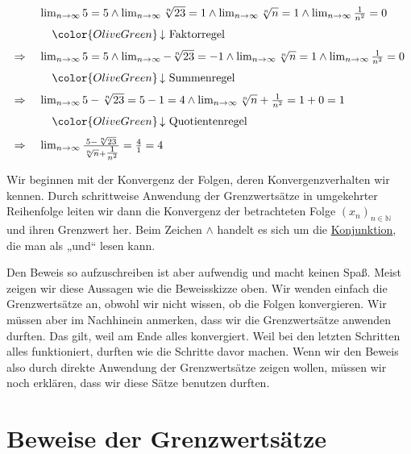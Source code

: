 \documentclass[fontsize=9pt,
               parskip=half-,
               DIV=14,
               listof=chapterentry,
               tocflat]{scrbook}
\begin{document}
\begin{align*}
{\begin{array}{ll}&\lim _{n\rightarrow \infty }5=5\land \lim _{n\rightarrow \infty }{\sqrt[{n}]{23}}=1\land \lim _{n\rightarrow \infty }{\sqrt[{n}]{n}}=1\land \lim _{n\rightarrow \infty }{\tfrac {1}{n^{2}}}=0\\[0.7em]&\quad {\color {OliveGreen}\left\downarrow \ {\text{Faktorregel}}\right.}\\[0.7em]\Rightarrow \ &\lim _{n\rightarrow \infty }5=5\land \lim _{n\rightarrow \infty }-{\sqrt[{n}]{23}}=-1\land \lim _{n\rightarrow \infty }{\sqrt[{n}]{n}}=1\land \lim _{n\rightarrow \infty }{\tfrac {1}{n^{2}}}=0\\[0.7em]&\quad {\color {OliveGreen}\left\downarrow \ {\text{Summenregel}}\right.}\\[0.7em]\Rightarrow \ &\lim _{n\rightarrow \infty }5-{\sqrt[{n}]{23}}=5-1=4\land \lim _{n\rightarrow \infty }{\sqrt[{n}]{n}}+{\tfrac {1}{n^{2}}}=1+0=1\\[0.7em]&\quad {\color {OliveGreen}\left\downarrow \ {\text{Quotientenregel}}\right.}\\[0.7em]\Rightarrow \ &\lim _{n\rightarrow \infty }{\frac {5-{\sqrt[{n}]{23}}}{{\sqrt[{n}]{n}}+{\tfrac {1}{n^{2}}}}}={\frac {4}{1}}=4\end{array}}
\end{align*}

Wir beginnen mit der Konvergenz der Folgen, deren Konvergenzverhalten wir kennen. Durch schrittweise Anwendung der Grenzwertsätze in umgekehrter Reihenfolge leiten wir dann die Konvergenz der betrachteten Folge $(x_{n})_{n\in \mathbb {N} }$ und ihren Grenzwert her. Beim Zeichen $\land $ handelt es sich um die \href{https://de.wikibooks.org/wiki/Mathe\_für\_Nicht-Freaks:\_Junktor\#Anker:Konjunktion}
{Konjunktion}, die man als „und“ lesen kann.

Den Beweis so aufzuschreiben ist aber aufwendig und macht keinen Spaß. Meist zeigen wir diese Aussagen wie die Beweisskizze oben. Wir wenden einfach die Grenzwertsätze an, obwohl wir nicht wissen, ob die Folgen konvergieren. Wir müssen aber im Nachhinein anmerken, dass wir die Grenzwertsätze anwenden durften. Das gilt, weil am Ende alles konvergiert. Weil bei den letzten Schritten alles funktioniert, durften wie die Schritte davor machen. Wenn wir den Beweis also durch direkte Anwendung der Grenzwertsätze zeigen wollen, müssen wir noch erklären, dass wir diese Sätze benutzen durften.
\clearpage
\section{Beweise der Grenzwertsätze}
\end{document}
